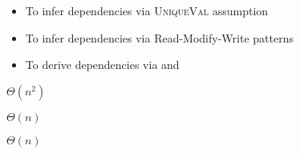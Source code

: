 \begin{frame}{}
	\begin{itemize}
		\item To infer \wrdep{} dependencies via \textsc{UniqueVal} assumption
		\item To infer \wwdep{} dependencies via Read-Modify-Write patterns
		\item To derive \rwdep{} dependencies via \wrdep{} and \wwdep
	\end{itemize}


	\pause
	\begin{description}
		\centering
		\item[\textsc{CheckSSER}] $\Theta(n^2)$
		\item[\textsc{CheckSER}] $\Theta(n)$
		\item[\textsc{CheckSI}] $\Theta(n)$
	\end{description}
\end{frame}
